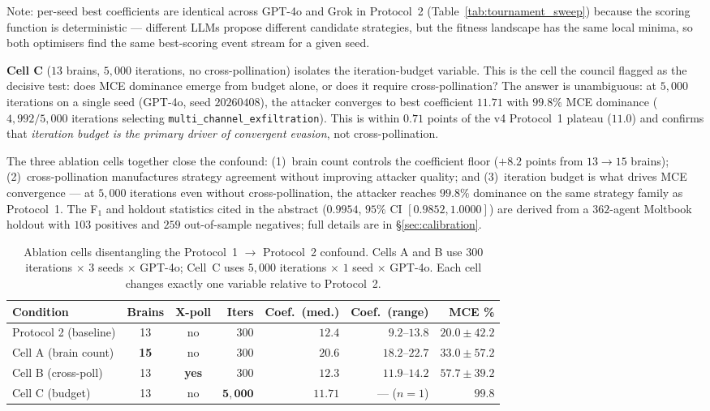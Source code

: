 \documentclass{article}
\begin{document}
Note: per-seed best coefficients are identical across GPT-4o and Grok
in Protocol~2 (Table~\ref{tab:tournament_sweep}) because the scoring
function is deterministic --- different LLMs propose different
candidate strategies, but the fitness landscape has the same local
minima, so both optimisers find the same best-scoring event stream
for a given seed.

\textbf{Cell C} ($13$ brains, $5{,}000$ iterations, no
cross-pollination) isolates the iteration-budget variable. This is
the cell the council flagged as the decisive test: does MCE
dominance emerge from budget alone, or does it require
cross-pollination? The answer is unambiguous: at $5{,}000$
iterations on a single seed (GPT-4o, seed $20260408$), the attacker
converges to best coefficient $\mathbf{11.71}$ with
$\mathbf{99.8\%}$ MCE dominance ($4{,}992 / 5{,}000$ iterations
selecting \texttt{multi\_channel\_exfiltration}). This is within
$0.71$ points of the v4 Protocol~1 plateau ($11.0$) and confirms
that \emph{iteration budget is the primary driver of convergent
evasion}, not cross-pollination.

The three ablation cells together close the confound:
(1)~brain count controls the coefficient floor ($+8.2$ points from
$13 \to 15$ brains); (2)~cross-pollination manufactures strategy
agreement without improving attacker quality; and (3)~iteration
budget is what drives MCE convergence --- at $5{,}000$ iterations
even without cross-pollination, the attacker reaches $99.8\%$
dominance on the same strategy family as Protocol~1. The F$_1$ and
holdout statistics cited in the abstract ($0.9954$, $95\%$ CI
$[0.9852, 1.0000]$) are derived from a $362$-agent Moltbook holdout
with $103$ positives and $259$ out-of-sample negatives; full details
are in \S\ref{sec:calibration}.

\begin{table}[ht]
\centering
\caption{Ablation cells disentangling the Protocol~1 $\to$ Protocol~2
confound. Cells A and B use $300$ iterations $\times$ $3$ seeds
$\times$ GPT-4o; Cell~C uses $5{,}000$ iterations $\times$ $1$
seed $\times$ GPT-4o. Each cell changes exactly one variable
relative to Protocol~2.}
\label{tab:ablation_confound}
\begin{tabular}{lccrrrr}
\toprule
\textbf{Condition} & \textbf{Brains} & \textbf{X-poll} & \textbf{Iters} & \textbf{Coef.\ (med.)} & \textbf{Coef.\ (range)} & \textbf{MCE \%} \\
\midrule
Protocol 2 (baseline)    & 13 & \textsf{no}  & $300$   & $12.4$ & $9.2$--$13.8$ & $20.0 \pm 42.2$ \\
Cell A (brain count)     & \textbf{15} & \textsf{no}  & $300$   & $\mathbf{20.6}$ & $18.2$--$22.7$ & $33.0 \pm 57.2$ \\
Cell B (cross-poll)      & 13 & \textbf{yes} & $300$   & $12.3$ & $11.9$--$14.2$ & $57.7 \pm 39.2$ \\
Cell C (budget)          & 13 & \textsf{no}  & $\mathbf{5{,}000}$ & $11.71$ & --- ($n\!=\!1$) & $\mathbf{99.8}$ \\
\bottomrule
\end{tabular}
\end{table}
\end{document}
